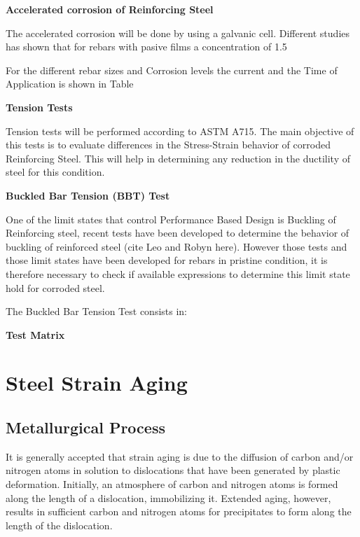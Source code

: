 \textbf{Accelerated corrosion  of Reinforcing Steel}

The accelerated corrosion will be done by using a galvanic cell. Different studies \cite{Ghods2010} has shown that for rebars with pasive films a concentration of 1.5%

For the different rebar sizes and Corrosion levels the current and the Time of Application is shown in Table 

\textbf{Tension Tests}

Tension tests will be performed according to ASTM A715. The main objective of this tests is to evaluate differences in the Stress-Strain behavior of corroded Reinforcing Steel. This will help in determining any reduction in the ductility of steel for this condition.

\textbf{Buckled Bar Tension (BBT) Test}

One of the limit states that control Performance Based Design is Buckling of Reinforcing steel, recent tests have been developed to determine the behavior of buckling of reinforced steel (cite Leo and Robyn here). However those tests and those limit states have been developed for rebars in pristine condition, it is therefore necessary to check if available expressions to determine this limit state hold for corroded steel.

The Buckled Bar Tension Test consists in:

\textbf{Test Matrix}

\section{Steel Strain Aging}

\subsection{Metallurgical Process}

It is generally accepted that strain aging is due to the diffusion of carbon and/or nitrogen atoms in solution to dislocations that have been generated by plastic deformation. Initially, an atmosphere of carbon and nitrogen atoms is formed along the length of a dislocation, immobilizing it. Extended aging, however, results in sufficient carbon and nitrogen atoms for precipitates to form along the length of the dislocation.

